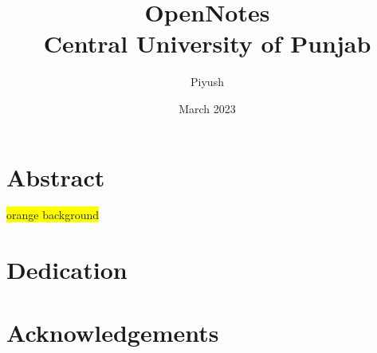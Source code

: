 \documentclass[11pt]{report}
\title{\textbf{\Large{Open\:Notes}}\\
{\Large Central University of Punjab}}
\author{Piyush}      %
\date{March 2023}
\begin{document}
\maketitle
\chapter*{Abstract}
\colorbox{yellow}{orange background}
\chapter*{Dedication}
\chapter*{Acknowledgements}

\tableofcontents
\listoffigures
\renewcommand\listoflistingscaption{List of codes}
\listoflistings %


\appendix




\end{document}
